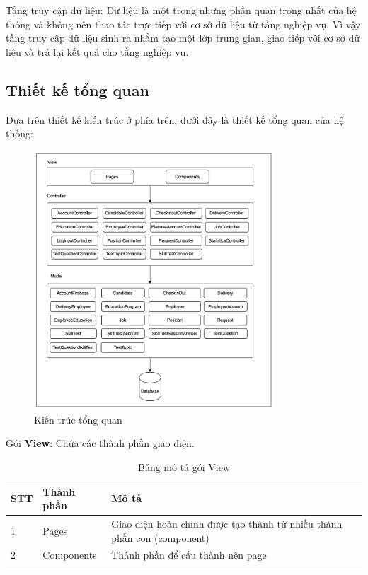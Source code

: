 \documentclass[../DoAn.tex]{subfiles}
\begin{document}
Tầng truy cập dữ liệu: Dữ liệu là một trong những phần quan trọng nhất của hệ thống và không nên thao tác trực tiếp với cơ sở dữ liệu từ tầng nghiệp vụ. Vì vậy tầng truy cập dữ liệu sinh ra nhằm tạo một lớp trung gian, giao tiếp với cơ sở dữ liệu và trả lại kết quả cho tầng nghiệp vụ.

\subsection{Thiết kế tổng quan}
Dựa trên thiết kế kiến trúc ở phía trên, dưới đây là thiết kế tổng quan của hệ thống:
\begin{figure}[H]
    \centering
    \includegraphics[width=0.8\textwidth]{Hinhve/KienTrucTongQuan.png}
    \caption{Kiến trúc tổng quan}
\end{figure}

Gói \textbf{View}: Chứa các thành phần giao diện.
\begin{longtable}{|p{}|p{}|p{}|}
\hline
\textbf{STT} & \textbf{Thành phần} & \textbf{Mô tả} \\ \hline
1   & Pages & Giao diện hoàn chỉnh được tạo thành từ nhiều thành phần con (component) \\ \hline
2   & Components & Thành phần để cấu thành nên page \\ \hline
\caption{Bảng mô tả gói View}
\end{longtable}
\end{document}
